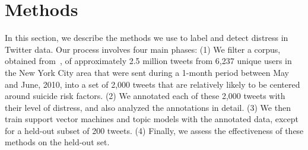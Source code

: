 \documentclass[11pt]{article}
\begin{document}
\section{Methods}
In this section, we describe the methods we use to label and detect distress in Twitter data. Our process involves four main phases: (1) We filter a corpus, obtained from~, of approximately 2.5 million tweets from 6,237 unique users in the New York City area that were sent during a 1-month period between May and June, 2010, into a set of 2,000 tweets that are relatively likely to be centered around suicide risk factors. (2) We annotated each of these 2,000 tweets with their level of distress, and also analyzed the annotations in detail. (3) We then train support vector machines and topic models with the annotated data, except for a held-out subset of 200 tweets. (4) Finally, we assess the effectiveness of these methods on the held-out set.
\end{document}
